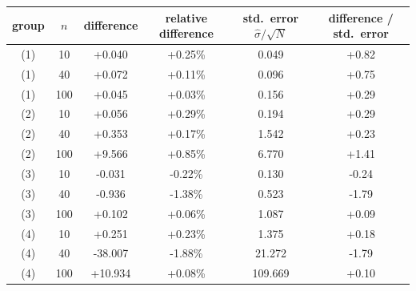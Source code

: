 \begin{tabular}{cccccc}
\toprule
group & $n$ & difference & relative difference & std.\ error $\hat\sigma/\sqrt N$ & difference / std.\ error \\ \midrule
(1) & 10 & +0.040 & +0.25\% & 0.049 & +0.82 \\
(1) & 40 & +0.072 & +0.11\% & 0.096 & +0.75 \\
(1) & 100 & +0.045 & +0.03\% & 0.156 & +0.29 \\
(2) & 10 & +0.056 & +0.29\% & 0.194 & +0.29 \\
(2) & 40 & +0.353 & +0.17\% & 1.542 & +0.23 \\
(2) & 100 & +9.566 & +0.85\% & 6.770 & +1.41 \\
(3) & 10 & -0.031 & -0.22\% & 0.130 & -0.24 \\
(3) & 40 & -0.936 & -1.38\% & 0.523 & -1.79 \\
(3) & 100 & +0.102 & +0.06\% & 1.087 & +0.09 \\
(4) & 10 & +0.251 & +0.23\% & 1.375 & +0.18 \\
(4) & 40 & -38.007 & -1.88\% & 21.272 & -1.79 \\
(4) & 100 & +10.934 & +0.08\% & 109.669 & +0.10 \\
\bottomrule
\end{tabular}
